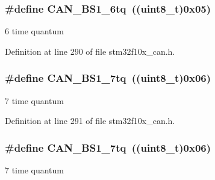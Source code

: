 \subsubsection[{\texorpdfstring{C\+A\+N\+\_\+\+B\+S1\+\_\+6tq}{CAN_BS1_6tq}}]{\setlength{\rightskip}{0pt plus 5cm}\#define C\+A\+N\+\_\+\+B\+S1\+\_\+6tq~(({\bf uint8\+\_\+t})0x05)}\hypertarget{group___c_a_n__time__quantum__in__bit__segment__1_gaa7fc6fcdf9c1c70ee9700b35e32e205e}{}\label{group___c_a_n__time__quantum__in__bit__segment__1_gaa7fc6fcdf9c1c70ee9700b35e32e205e}
6 time quantum 

Definition at line 290 of file stm32f10x\+\_\+can.\+h.

\subsubsection[{\texorpdfstring{C\+A\+N\+\_\+\+B\+S1\+\_\+7tq}{CAN_BS1_7tq}}]{\setlength{\rightskip}{0pt plus 5cm}\#define C\+A\+N\+\_\+\+B\+S1\+\_\+7tq~(({\bf uint8\+\_\+t})0x06)}\hypertarget{group___c_a_n__time__quantum__in__bit__segment__1_gafec90578d657073a671b6326f3bfcf8e}{}\label{group___c_a_n__time__quantum__in__bit__segment__1_gafec90578d657073a671b6326f3bfcf8e}
7 time quantum 

Definition at line 291 of file stm32f10x\+\_\+can.\+h.

\subsubsection[{\texorpdfstring{C\+A\+N\+\_\+\+B\+S1\+\_\+7tq}{CAN_BS1_7tq}}]{\setlength{\rightskip}{0pt plus 5cm}\#define C\+A\+N\+\_\+\+B\+S1\+\_\+7tq~(({\bf uint8\+\_\+t})0x06)}\hypertarget{group___c_a_n__time__quantum__in__bit__segment__1_gafec90578d657073a671b6326f3bfcf8e}{}\label{group___c_a_n__time__quantum__in__bit__segment__1_gafec90578d657073a671b6326f3bfcf8e}
7 time quantum 

